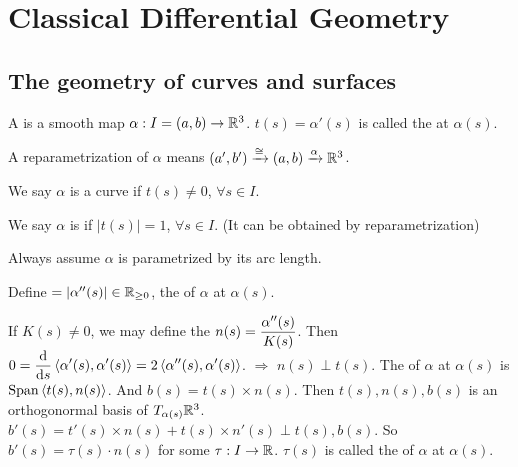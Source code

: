 \section{Classical Differential Geometry}
\subsection{The geometry of curves and surfaces}
A  is a smooth map  $ \alpha:I=(a,b)\rightarrow \mathbb R^3 $.  $ t(s)=\alpha'(s) $ is called the   at  $ \alpha(s) $.

A reparametrization of  $ \alpha $ means  $ (a',b')\xrightarrow{\cong}(a,b)\xrightarrow{\alpha}\mathbb R^3 $.

We say  $ \alpha  $ is a  curve if  $ t(s)\neq 0 $,  $ \forall s\in I $.

We say  $ \alpha  $ is  if  $ |t(s)|=1 $, $ \forall s\in I $. (It can be obtained by reparametrization)

Always assume  $ \alpha  $ is parametrized by its arc length.

Define  $= |\alpha''(s)|\in \mathbb R_{ \geq 0} $, the  of  $ \alpha $ at  $ \alpha(s) $.    

If  $ K(s)\neq 0 $, we may define the   $ n(s)=\displaystyle\frac{\alpha''(s)}{K(s)} $. Then  $ 0=\displaystyle\frac{\mathrm{d}}{\mathrm{d} s}\left<\alpha'(s),\alpha'(s)\right>=2\left<\alpha''(s),\alpha'(s)\right> $. $ \Rightarrow $  $ n(s)\perp t(s) $.   The  of  $ \alpha  $ at  $ \alpha(s) $ is  $ \mathrm{Span}\left<t(s),n(s)\right> $.   And   $ b(s)=t(s)\times n(s) $. Then  $ t(s),n(s),b(s) $ is an orthogonormal basis  of  $ T_{\alpha(s)}\mathbb R^3 $.  $ b'(s)=t'(s)\times n(s)+t(s)\times n'(s)\perp t(s),b(s) $. So  $ b'(s)=\tau(s)\cdot n(s) $ for some  $ \tau:I\rightarrow \mathbb R $.  $ \tau(s) $ is called the  of  $ \alpha  $ at  $ \alpha(s) $.

